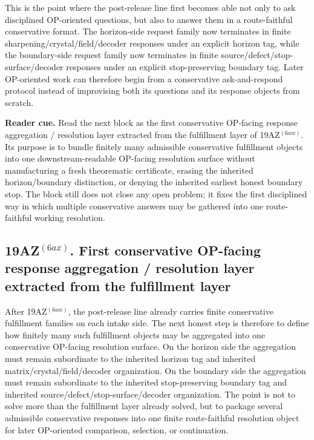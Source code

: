 \begin{remark}
\label{rem:what-the-first-conservative-op-facing-response-fulfillment-layer-now-buys}
This is the point where the post-release line first becomes able not only to ask disciplined OP-oriented questions, but also to answer them in a route-faithful conservative format. The horizon-side request family now terminates in finite sharpening/crystal/field/decoder responses under an explicit horizon tag, while the boundary-side request family now terminates in finite source/defect/stop-surface/decoder responses under an explicit stop-preserving boundary tag. Later OP-oriented work can therefore begin from a conservative ask-and-respond protocol instead of improvising both its questions and its response objects from scratch.
\end{remark}



\noindent\textbf{Reader cue.} Read the next block as the first conservative OP-facing response aggregation / resolution layer extracted from the fulfillment layer of 19AZ$^{(6aw)}$. Its purpose is to bundle finitely many admissible conservative fulfillment objects into one downstream-readable OP-facing resolution surface without manufacturing a fresh theorematic certificate, erasing the inherited horizon/boundary distinction, or denying the inherited earliest honest boundary stop. The block still does not close any open problem; it fixes the first disciplined way in which multiple conservative answers may be gathered into one route-faithful working resolution.

\subsection*{19AZ$^{(6ax)}$. First conservative OP-facing response aggregation / resolution layer extracted from the fulfillment layer}
\label{sec:first-conservative-op-facing-response-aggregation-resolution-layer-extracted-from-the-fulfillment-layer}
After 19AZ$^{(6aw)}$, the post-release line already carries finite conservative fulfillment families on each intake side. The next honest step is therefore to define how finitely many such fulfillment objects may be aggregated into one conservative OP-facing resolution surface. On the horizon side the aggregation must remain subordinate to the inherited horizon tag and inherited matrix/crystal/field/decoder organization. On the boundary side the aggregation must remain subordinate to the inherited stop-preserving boundary tag and inherited source/defect/stop-surface/decoder organization. The point is not to solve more than the fulfillment layer already solved, but to package several admissible conservative responses into one finite route-faithful resolution object for later OP-oriented comparison, selection, or continuation.

